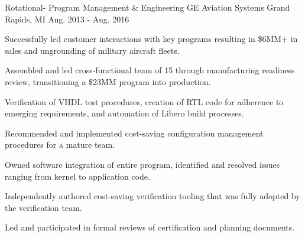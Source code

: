 \begin{cventries}
    \cventry
      {Rotational- Program Management \& Engineering} %
      {GE Aviation Systems} %
      {Grand Rapids, MI} %
      {Aug. 2013 - Aug. 2016} %
      {
        \begin{cvitems} %
          \item {Successfully led customer interactions with key programs resulting in \$6MM+ in sales and ungrounding of military aircraft fleets.}
          \item {Assembled and led cross-functional team of 15 through manufacturing readiness review, transitioning a \$23MM program into production.}
          \item {Verification of VHDL test procedures, creation of RTL code for adherence to emerging requirements, and automation of Libero build processes.}
          \item {Recommended and implemented cost-saving configuration management procedures for a mature team.}
          \item {Owned software integration of entire program, identified and resolved issues ranging from kernel to application code.}
          \item {Independently authored cost-saving verification tooling that was fully adopted by the verification team.}
          \item {Led and participated in formal reviews of certification and planning documents.}
        \end{cvitems}
      }

\end{cventries}
